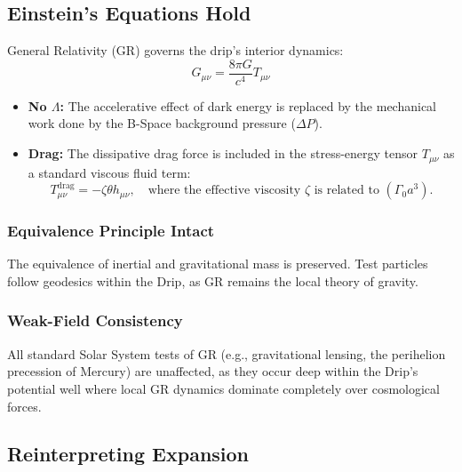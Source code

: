 \documentclass{BSpacePaper} %
\begin{document}
\begin{appendices}
\subsection{Einstein’s Equations Hold}
General Relativity (GR) governs the drip’s interior dynamics:
\begin{equation}
    G_{\mu\nu} = \frac{8\pi G}{c^4} T_{\mu\nu}
\end{equation}
\begin{itemize}
    \item \textbf{No \(\Lambda\):} The accelerative effect of dark energy is replaced by the mechanical work done by the B-Space background pressure (\(\Delta P\)).
    \item \textbf{Drag:} The dissipative drag force is included in the stress-energy tensor \(T_{\mu\nu}\) as a standard viscous fluid term:
    \begin{equation}
        T_{\mu\nu}^{\text{drag}} = -\zeta \theta h_{\mu\nu}, \quad \text{where the effective viscosity } \zeta \text{ is related to } (\Gamma_0 a^3).
    \end{equation}
\end{itemize}

\subsubsection{Equivalence Principle Intact}
The equivalence of inertial and gravitational mass is preserved. Test particles follow geodesics within the Drip, as GR remains the local theory of gravity.

\subsubsection{Weak-Field Consistency}
All standard Solar System tests of GR (e.g., gravitational lensing, the perihelion precession of Mercury) are unaffected, as they occur deep within the Drip's potential well where local GR dynamics dominate completely over cosmological forces.

\subsection{Reinterpreting Expansion}


\end{appendices}
\end{document}
